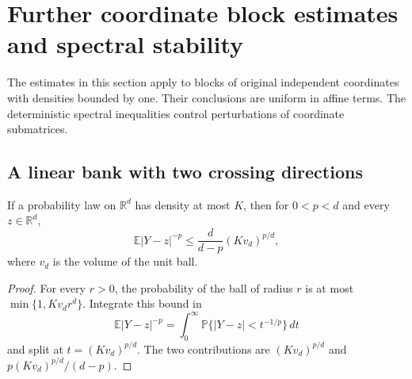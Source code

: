 \section{Further coordinate block estimates and spectral stability}
\label{sec:additional-results}

The estimates in this section apply to blocks of original independent
coordinates with densities bounded by one.  Their conclusions are
uniform in affine terms.  The deterministic spectral inequalities
control perturbations of coordinate submatrices.

\subsection{A linear bank with two crossing directions}

\begin{lemma}
\label{supp:negative-moment}
If a probability law on $\mathbb R^d$ has density at most $K$, then for
$0<p<d$ and every $z\in\mathbb R^d$,
\[
 \mathbb E|Y-z|^{-p}\le\frac d{d-p}(K v_d)^{p/d},
\]
where $v_d$ is the volume of the unit ball.
\end{lemma}
\begin{proof}
For every $r>0$, the probability of the ball of radius $r$ is at most
$\min\{1,Kv_dr^d\}$.  Integrate this bound in
\[
 \mathbb E|Y-z|^{-p}
 =\int_0^\infty\mathbb P\{|Y-z|<t^{-1/p}\}\,dt
\]
and split at $t=(Kv_d)^{p/d}$.  The two contributions are
$(Kv_d)^{p/d}$ and $p(Kv_d)^{p/d}/(d-p)$.
\end{proof}

